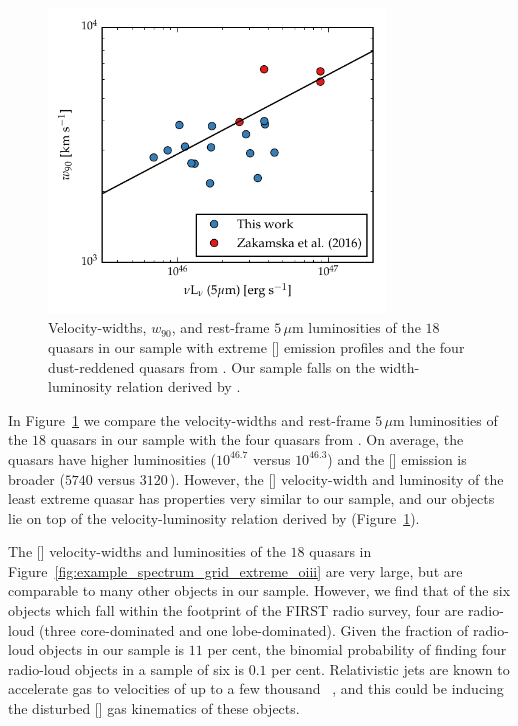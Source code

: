 \begin{figure}
\centering 
    \includegraphics[width=0.8\textwidth]{figures/chapter04/fivemicron_w90.pdf} 
    \caption[{Velocity-widths and rest-frame $5$\,$\mu$m luminosities of the $18$ quasars in our sample with extreme [] emission profiles and the four dust-reddened quasars from \citet{zakamska16}.}]{Velocity-widths, $w_{90}$, and rest-frame $5$\,$\mu$m luminosities of the $18$ quasars in our sample with extreme [] emission profiles and the four dust-reddened quasars from \citet{zakamska16}. Our sample falls on the width-luminosity relation derived by \citet{zakamska16}.}     
    \label{fig:fivemicron_w90}
\end{figure}

In Figure~\ref{fig:fivemicron_w90} we compare the velocity-widths and rest-frame $5$\,$\mu$m luminosities of the $18$ quasars in our sample with the four quasars from \citet{zakamska16}.
On average, the \citet{zakamska16} quasars have higher luminosities ($10^{46.7}$ versus $10^{46.3}$\ergs) and the [] emission is broader ($5740$ versus $3120$\,\kms).
However, the [] velocity-width and luminosity of the least extreme \citet{zakamska16} quasar has properties very similar to our sample, and our objects lie on top of the velocity-luminosity relation derived by \citet{zakamska16} (Figure~\ref{fig:fivemicron_w90}).

The [] velocity-widths and luminosities of the $18$ quasars in Figure~\ref{fig:example_spectrum_grid_extreme_oiii} are very large, but are comparable to many other objects in our sample.
However, we find that of the six objects which fall within the footprint of the FIRST radio survey, four are radio-loud (three core-dominated and one lobe-dominated).
Given the fraction of radio-loud objects in our sample is $11$ per cent, the binomial probability of finding four radio-loud objects in a sample of six is $0.1$ per cent. 
Relativistic jets are known to accelerate gas to velocities of up to a few thousand \kms\, \citep[e.g.][]{nesvadba06,nesvadba08}, and this could be inducing the disturbed [] gas kinematics of these objects. 

